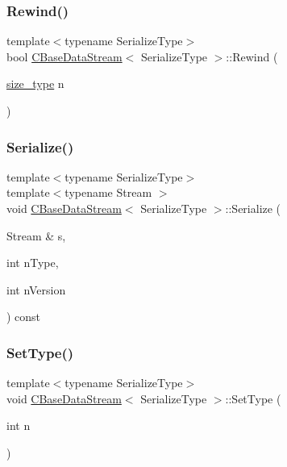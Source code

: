 \subsubsection{\texorpdfstring{Rewind()}{Rewind()}}
{\footnotesize\ttfamily template$<$typename Serialize\+Type$>$ \\
bool \mbox{\hyperlink{class_c_base_data_stream}{C\+Base\+Data\+Stream}}$<$ Serialize\+Type $>$\+::Rewind (\begin{DoxyParamCaption}\item[{\mbox{\hyperlink{class_c_base_data_stream_ad042ddea628c43357b9b13be89c71964}{size\+\_\+type}}}]{n }\end{DoxyParamCaption})\hspace{0.3cm}{\ttfamily [inline]}}

\mbox{\label{class_c_base_data_stream_af83455eaa7f251031dd20f7075637701}} 
\subsubsection{\texorpdfstring{Serialize()}{Serialize()}}
{\footnotesize\ttfamily template$<$typename Serialize\+Type$>$ \\
template$<$typename Stream $>$ \\
void \mbox{\hyperlink{class_c_base_data_stream}{C\+Base\+Data\+Stream}}$<$ Serialize\+Type $>$\+::Serialize (\begin{DoxyParamCaption}\item[{Stream \&}]{s,  }\item[{int}]{n\+Type,  }\item[{int}]{n\+Version }\end{DoxyParamCaption}) const\hspace{0.3cm}{\ttfamily [inline]}}

\mbox{\label{class_c_base_data_stream_a02c042f25f960b7c974db3c30ee056a5}} 
\subsubsection{\texorpdfstring{Set\+Type()}{SetType()}}
{\footnotesize\ttfamily template$<$typename Serialize\+Type$>$ \\
void \mbox{\hyperlink{class_c_base_data_stream}{C\+Base\+Data\+Stream}}$<$ Serialize\+Type $>$\+::Set\+Type (\begin{DoxyParamCaption}\item[{int}]{n }\end{DoxyParamCaption})\hspace{0.3cm}{\ttfamily [inline]}}


